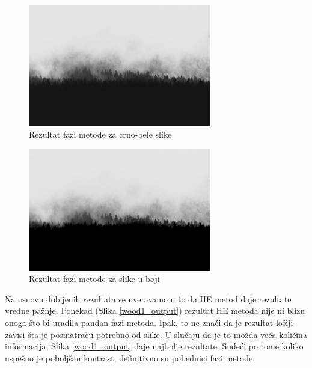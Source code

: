 \documentclass[12pt,a4paper]{article}
\theoremstyle{definition}
\theoremstyle{remark}
\theoremstyle{plain}
\begin{document}
\begin{multicols}{2}
\begin{figure}[H]
\centering
\includegraphics[width=8cm]{images/fuzzy_grayscale_1.jpg}
  \caption{Rezultat fazi metode za crno-bele slike}\label{river1}
\end{figure}
\columnbreak
\begin{figure}[H]
\centering
\includegraphics[width=8cm]{images/fuzzy_color_4.jpg}
  \caption{Rezultat fazi metode za slike u boji}\label{river_output1}
\end{figure}
\end{multicols}

Na osnovu dobijenih rezultata se uveravamo u to da HE metod daje rezultate vredne pa\v znje. Ponekad (Slika \ref{wood1_output}) rezultat HE metoda nije ni blizu onoga \v sto bi uradila pandan fazi metoda. Ipak, to ne zna\v ci da je rezultat lo\v siji - zavisi \v sta je posmatra\v cu potrebno od slike. U slu\v caju da je to mo\v zda ve\' ca koli\v cina informacija, Slika \ref{wood1_output} daje najbolje rezultate. Sude\' ci po tome koliko uspe\v sno je pobolj\v san kontrast, definitivno su pobednici fazi metode.
\end{document}
